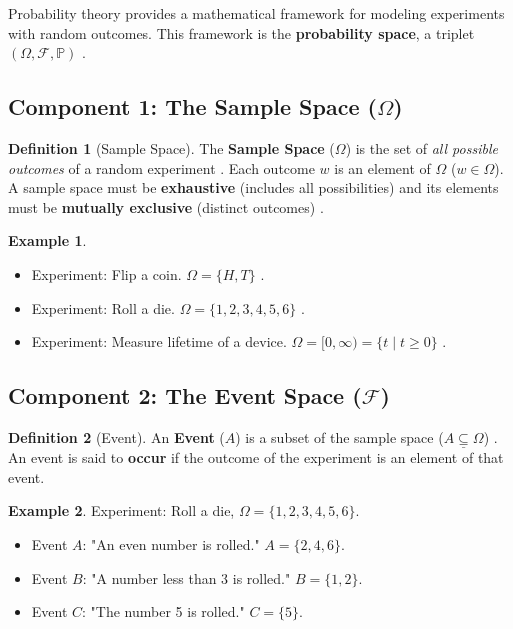 \documentclass[12pt, a4paper]{article}
\theoremstyle{definition}
\newtheorem{definition}{Definition}[section]
\newtheorem{example}{Example}[section]
\theoremstyle{plain}
\theoremstyle{remark}
\begin{document}
Probability theory provides a mathematical framework for modeling experiments with random outcomes. This framework is the \textbf{probability space}, a triplet $(\Omega, \mathcal{F}, \mathbb{P})$ \cite{faculty_prob, chan}.

\subsection{Component 1: The Sample Space ($\Omega$)}

\begin{definition}[Sample Space]
    The \textbf{Sample Space} ($\Omega$) is the set of \emph{all possible outcomes} of a random experiment \cite{ross, chan}. Each outcome $w$ is an element of $\Omega$ ($w \in \Omega$). A sample space must be \textbf{exhaustive} (includes all possibilities) and its elements must be \textbf{mutually exclusive} (distinct outcomes) \cite{chan}.
\end{definition}

\begin{example}
    \begin{itemize}
        \item Experiment: Flip a coin. $\Omega = \{H, T\}$ \cite{ross}.
        \item Experiment: Roll a die. $\Omega = \{1, 2, 3, 4, 5, 6\}$ \cite{ross}.
        \item Experiment: Measure lifetime of a device. $\Omega = [0, \infty) = \{t \mid t \ge 0\}$ \cite{ross}.
    \end{itemize}
\end{example}

\subsection{Component 2: The Event Space ($\mathcal{F}$)}

\begin{definition}[Event]
    An \textbf{Event} ($A$) is a subset of the sample space ($\underline{A \subseteq \Omega}$) \cite{ross, chan}. An event is said to \textbf{occur} if the outcome of the experiment is an element of that event.
\end{definition}

\begin{example}
    Experiment: Roll a die, $\Omega = \{1, 2, 3, 4, 5, 6\}$.
    \begin{itemize}
        \item Event $A$: "An even number is rolled." $A = \{2, 4, 6\}$.
        \item Event $B$: "A number less than 3 is rolled." $B = \{1, 2\}$.
        \item Event $C$: "The number 5 is rolled." $C = \{5\}$.
    \end{itemize}
\end{example}
\end{document}
